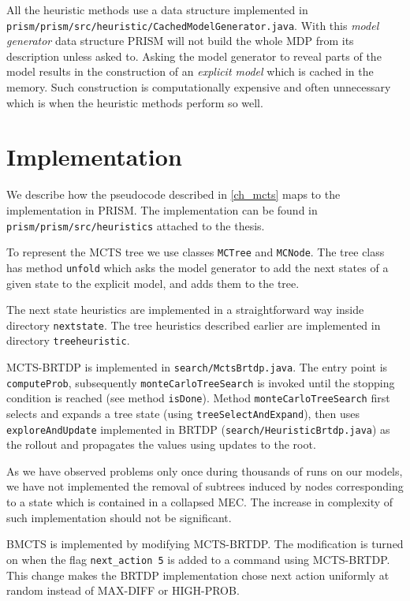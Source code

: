 All the heuristic methods use a data structure implemented in
\verb|prism/prism/src/heuristic/CachedModelGenerator.java|.
With this {\em model generator} data structure PRISM will not build the
whole MDP from its description unless asked to.
Asking the model generator to reveal parts of the model results in the
construction of an {\em explicit model} which is cached in the memory.
Such construction is computationally expensive and often unnecessary
which is when the heuristic methods perform so well.

\section{Implementation}

We describe how the pseudocode described in \autoref{ch_mcts} maps to
the implementation in PRISM. The implementation can be found in
\verb|prism/prism/src/heuristics| attached to the thesis.

To represent the MCTS tree we use classes \verb|MCTree| and
\verb|MCNode|. The tree class has method \verb|unfold|
which asks the model generator to add the next states of a given state
to the explicit model, and adds them to the tree.

The next state heuristics are implemented in a straightforward way
inside directory \verb|nextstate|. The tree heuristics described earlier
are implemented in directory \verb|treeheuristic|.

MCTS-BRTDP is implemented in \verb|search/MctsBrtdp.java|. The entry
point is \verb|computeProb|, subsequently
\verb|monteCarloTreeSearch| is invoked until the stopping condition
is reached (see method \verb|isDone|). Method
\verb|monteCarloTreeSearch| first selects and expands a tree state
(using \verb|treeSelectAndExpand|),
then uses \verb|exploreAndUpdate| implemented in BRTDP
(\verb|search/HeuristicBrtdp.java|) as the rollout and propagates
the values using updates to the root.

As we have observed problems only once during thousands of runs on our
models, we have not implemented the removal of subtrees induced by nodes
corresponding to a state which is contained in a collapsed MEC. The
increase in complexity of such implementation should not be significant.

BMCTS is implemented by modifying MCTS-BRTDP. The modification is turned
on when the flag \verb|next_action 5| is added to a command using
MCTS-BRTDP. This change makes the BRTDP implementation chose next action
uniformly at random instead of MAX-DIFF or HIGH-PROB.

